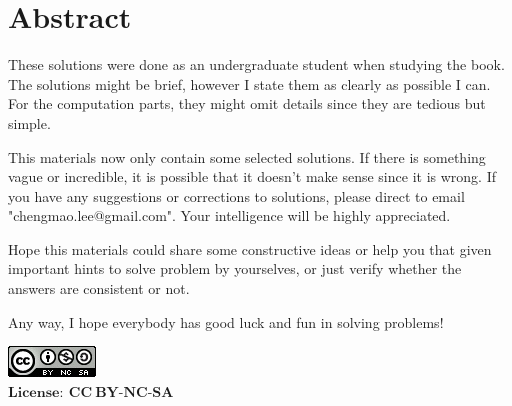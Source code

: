 \graphicspath{ {license/} }

\newpage
{}
{}
\chapter*{Abstract}
These solutions were done as an undergraduate student when studying the book.
The solutions might be brief, however I state them as clearly as possible I can.
For the computation parts, they might omit details since they are tedious but simple.

\vspace{2ex}

This materials now only contain some selected solutions. 
If there is something vague or incredible, it is possible that it doesn't make sense since it is wrong.
If you have any suggestions or corrections to solutions, please direct to email "chengmao.lee@gmail.com".
Your intelligence will be highly appreciated.

\vspace{2ex}

Hope this materials could share some constructive ideas or help you that given important hints to solve problem by yourselves, or just verify whether the answers are consistent or not.

\vspace{2ex}

Any way, I hope everybody has good luck and fun in solving problems!

\vspace{7cm}

\includegraphics[]{CC_BY-NC-SA} \\
$\mathbf{License:\ CC\ BY\text{-}NC\text{-}SA}$ 